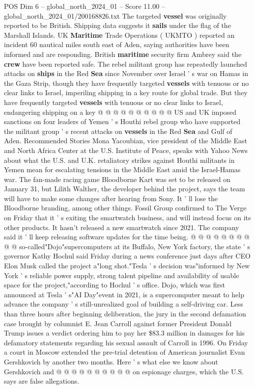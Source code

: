 \begin{textsample}{POS Dim 6 – global\_north\_2024\_01 – Score 11.00 – global\_north\_2024\_01/200168826.txt}
The targeted \textbf{vessel} was originally reported to be British.
Shipping data suggests it \textbf{sails} under the flag of the Marshall Islands.
UK \textbf{Maritime} Trade Operations ( UKMTO ) reported an incident 60 nautical miles south east of Aden, saying authorities have been informed and are responding.
British \textbf{maritime} security firm Ambrey said the \textbf{crew} have been reported safe.
The rebel militant group has repeatedly launched attacks on \textbf{ships} in the Red \textbf{Sea} since November over Israel ' s war on Hamas in the Gaza Strip, though they have frequently targeted \textbf{vessels} with tenuous or no clear links to Israel, imperiling shipping in a key route for global trade.
But they have frequently targeted \textbf{vessels} with tenuous or no clear links to Israel, endangering shipping on a key @ @ @ @ @ @ @ @ @ @ US and UK imposed sanctions on four leaders of Yemen ' s Houthi rebel group who have supported the militant group ' s recent attacks on \textbf{vessels} in the Red \textbf{Sea} and Gulf of Aden.
Recommended Stories Mona Yacoubian, vice president of the Middle East and North Africa Center at the U.S.
Institute of Peace, speaks with Yahoo News about what the U.S. and U.K. retaliatory strikes against Houthi militants in Yemen mean for escalating tensions in the Middle East amid the Israel-Hamas war.
The fan-made racing game Bloodborne Kart was set to be released on January 31, but Lilith Walther, the developer behind the project, says the team will have to make some changes after hearing from Sony.
It ' ll lose the Bloodborne branding, among other things.
Fossil Group confirmed to The Verge on Friday that it ' s exiting the smartwatch business, and will instead focus on its other products.
It hasn't released a new smartwatch since 2021.
The company said it ' ll keep releasing software updates for the time being. @ @ @ @ @ @ @ @ @ @ so-called"Dojo"supercomputers at its Buffalo, New York factory, the state ' s governor Kathy Hochul said Friday during a news conference just days after CEO Elon Musk called the project a"long shot."Tesla ' s decision was"informed by New York ' s reliable power supply, strong talent pipeline and availability of usable space for the project,"according to Hochul ' s office.
Dojo, which was first announced at Tesla ' s"AI Day"event in 2021, is a supercomputer meant to help advance the company ' s still-unrealized goal of building a self-driving car.
Less than three hours after beginning deliberation, the jury in the second defamation case brought by columnist E.
Jean Carroll against former President Donald Trump issues a verdict ordering him to pay her \$83.3 million in damages for his defamatory statements regarding his sexual assault of Carroll in 1996.
On Friday a court in Moscow extended the pre-trial detention of American journalist Evan Gershkovich by another two months.
Here ' s what else we know about Gershkovich and @ @ @ @ @ @ @ @ @ @ on espionage charges, which the U.S. says are false allegations.

\end{textsample}
